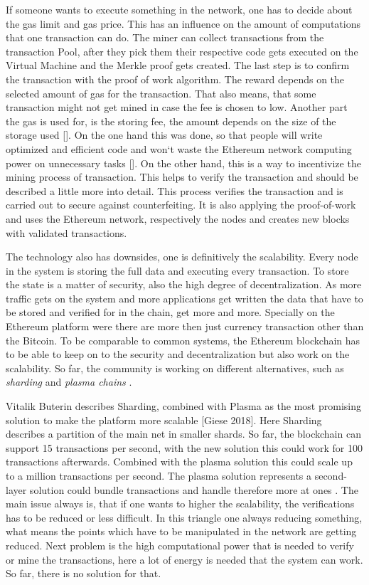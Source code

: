 If someone wants to execute something in the network, one has to decide about the gas limit and gas price. 
This has an influence on the amount of computations that one transaction can do.
The miner can collect transactions from the transaction Pool, after they pick them their respective code gets executed on the Virtual Machine and the Merkle proof gets created. 
The last step is to confirm the transaction with the proof of work algorithm. 
The reward depends on the selected amount of gas for the transaction. 
That also means, that some transaction might not get mined in case the fee is chosen to low. Another part the gas is used for, is the storing fee, the amount depends on the size of the storage used [].
On the one hand this was done, so that people will write optimized and efficient code and won`t waste the Ethereum network computing power on unnecessary tasks [].
On the other hand, this is a way to incentivize the mining process of transaction. 
This helps to verify the transaction and should be described a little more into detail. 
This process verifies the transaction and is carried out to secure against counterfeiting. 
It is also applying the proof-of-work and uses the Ethereum network, respectively the nodes and creates new blocks with validated transactions. \cite{preethi}

The technology also has downsides, one is definitively the scalability. 
Every node in the system is storing the full data and executing every transaction. 
To store the state is a matter of security, also the high degree of decentralization. 
As more traffic gets on the system and more applications get written the data that have to be stored and verified for in the chain, get more and more. 
Specially on the Ethereum platform were there are more then just currency transaction other than the Bitcoin. 
To be comparable to common systems, the Ethereum blockchain has to be able to keep on to the security and decentralization but also work on the scalability. 
So far, the community is working on different alternatives, such as \emph{sharding} and \emph{plasma chains} \cite{Gadaleta2018}.

Vitalik Buterin describes Sharding, combined with Plasma as the most promising solution to make the platform more scalable [Giese 2018].
Here Sharding describes a partition of the main net in smaller shards. 
So far, the blockchain can support 15 transactions per second, with the new solution this could work for 100 transactions afterwards. 
Combined with the plasma solution this could scale up to a million transactions per second. 
The plasma solution represents a second-layer solution could bundle transactions and handle therefore more at ones \cite{Giese2018}.
The main issue always is, that if one wants to higher the scalability, the verifications has to be reduced or less difficult. 
In this triangle one always reducing something, what means the points which have to be manipulated in the network are getting reduced.
Next problem is the high computational power that is needed to verify or mine the transactions, here a lot of energy is needed that the system can work. So far, there is no solution for that.

